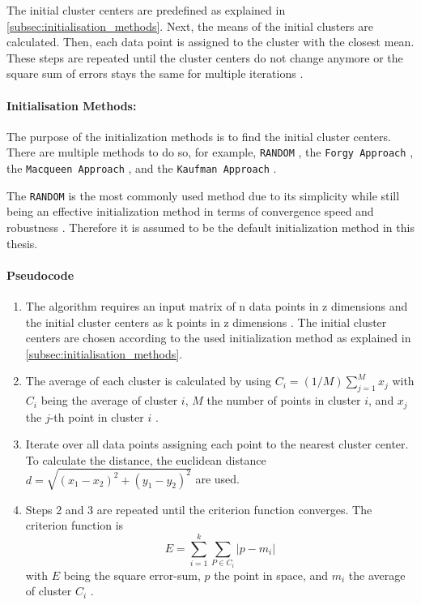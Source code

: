 The initial cluster centers are predefined as explained in \autoref*{subsec:initialisation_methods}.
Next, the means of the initial clusters are calculated.
Then, each data point is assigned to the cluster with the closest mean.
These steps are repeated until the cluster centers do not change anymore or the square sum of errors stays the same for multiple iterations \cite{HAR-KMA}.

\paragraph*{Initialisation Methods:}
\label{subsec:initialisation_methods}
The purpose of the initialization methods is to find the initial cluster centers.
There are multiple methods to do so, for example, \texttt{RANDOM} \cite{PEN-ECI}, the \texttt{Forgy Approach} \cite{AND-CAA}, the \texttt{Macqueen Approach} \cite{MCQ-MCA}, and the \texttt{Kaufman Approach} \cite{KAU-FGD}.

The \texttt{RANDOM} is the most commonly used method due to its simplicity while still being an effective initialization method in terms of convergence speed and robustness \cite{PEN-ECI}.
Therefore it is assumed to be the default initialization method in this thesis.

\paragraph*{Pseudocode}
\begin{enumerate}
    \item The algorithm requires an input matrix of n data points in z dimensions and the initial cluster centers as k points in z dimensions \cite{HAR-KMA}.
          The initial cluster centers are chosen according to the used initialization method as explained in \autoref*{subsec:initialisation_methods}.
    \item The average of each cluster is calculated by using $C_i = (1/M) \sum_{j=1}^{M}x_j$ with $C_i$ being the average of cluster $i$, $M$ the number of points in cluster $i$, and $x_j$ the $j$-th point in cluster $i$ \cite{SYA-IKC}.
    \item Iterate over all data points assigning each point to the nearest cluster center.
          To calculate the distance, the euclidean distance $d = \sqrt{(x_1-x_2)^2+(y_1-y_2)^2}$ are used.
    \item Steps 2 and 3 are repeated until the criterion function converges.
          The criterion function is \begin{equation}\label{eq:sse}E=\sum_{i=1}^{k} \sum_{P \in C_i}|p-m_i|\end{equation} with $E$ being the square error-sum, $p$ the point in space, and $m_i$ the average of cluster $C_i$ \cite{LIU-BDE}.
\end{enumerate}

